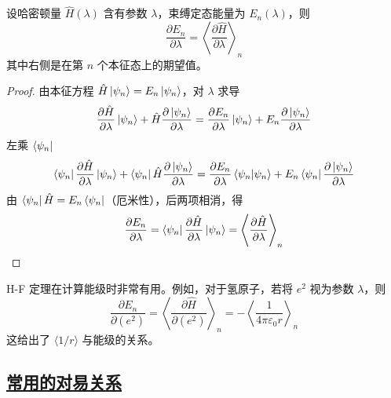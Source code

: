\begin{theorem}
    设哈密顿量 $\hat{H}(\lambda)$ 含有参数 $\lambda$，束缚定态能量为 $E_n(\lambda)$，则
    \begin{equation}
        \frac{\partial E_n}{\partial \lambda} = \left\langle \frac{\partial \hat{H}}{\partial \lambda} \right\rangle_n
    \end{equation}
    其中右侧是在第 $n$ 个本征态上的期望值。
\end{theorem}

\begin{proof}
    由本征方程 $\hat{H}\ket{\psi_n} = E_n\ket{\psi_n}$，对 $\lambda$ 求导
    \begin{equation}
        \frac{\partial\hat{H}}{\partial\lambda}\ket{\psi_n} + \hat{H}\frac{\partial\ket{\psi_n}}{\partial\lambda} = \frac{\partial E_n}{\partial\lambda}\ket{\psi_n} + E_n\frac{\partial\ket{\psi_n}}{\partial\lambda}
    \end{equation}
    左乘 $\bra{\psi_n}$
    \begin{equation}
        \bra{\psi_n}\frac{\partial\hat{H}}{\partial\lambda}\ket{\psi_n} + \bra{\psi_n}\hat{H}\frac{\partial\ket{\psi_n}}{\partial\lambda} = \frac{\partial E_n}{\partial\lambda}\braket{\psi_n}{\psi_n} + E_n\bra{\psi_n}\frac{\partial\ket{\psi_n}}{\partial\lambda}
    \end{equation}
    由 $\bra{\psi_n}\hat{H} = E_n\bra{\psi_n}$（厄米性），后两项相消，得
    \begin{equation}
        \frac{\partial E_n}{\partial\lambda} = \bra{\psi_n}\frac{\partial\hat{H}}{\partial\lambda}\ket{\psi_n} = \left\langle \frac{\partial\hat{H}}{\partial\lambda} \right\rangle_n
    \end{equation}
\end{proof}

\begin{remark}
    H-F 定理在计算能级时非常有用。例如，对于氢原子，若将 $e^2$ 视为参数 $\lambda$，则
    \begin{equation}
        \frac{\partial E_n}{\partial(e^2)} = \left\langle \frac{\partial\hat{H}}{\partial(e^2)} \right\rangle_n = -\left\langle \frac{1}{4\pi\varepsilon_0 r} \right\rangle_n
    \end{equation}
    这给出了 $\langle 1/r \rangle$ 与能级的关系。
\end{remark}

\subsection{\protect\hyperlink{:}{常用的对易关系}}

